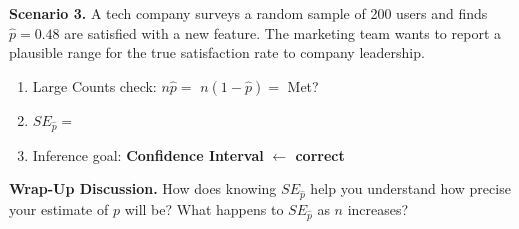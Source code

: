 \documentclass[10pt]{article}
\begin{document}
\vspace{0.15in}

\textbf{Scenario 3.} A tech company surveys a random sample of 200 users and finds
$\hat p = 0.48$ are satisfied with a new feature. The marketing team wants to report
a plausible range for the true satisfaction rate to company leadership.

\begin{enumerate}[label=\alph*.]
  \item Large Counts check: $n\hat p = $  \quad $n(1-\hat p) = $  \quad Met? 
  \item $SE_{\hat p} = $ 
  \item Inference goal: \textbf{Confidence Interval} \textcolor{keyred}{\textbf{$\leftarrow$ correct}}
\end{enumerate}

\vspace{0.15in}

\begin{reflectionbox}
\textbf{Wrap-Up Discussion.} How does knowing $SE_{\hat p}$ help you understand how
precise your estimate of $p$ will be? What happens to $SE_{\hat p}$ as $n$ increases?
\end{reflectionbox}
\end{document}
